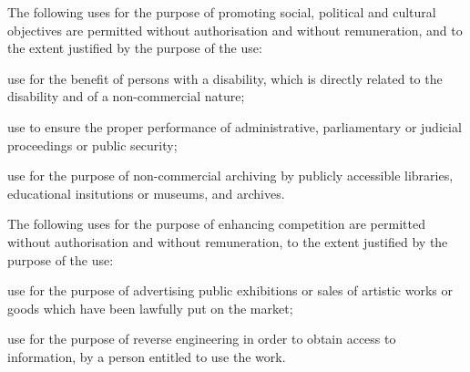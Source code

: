 \begin{contract}
\label{Par:UsesPermittedToPromoteSocialPoliticalAndCulturalObjectives}
\Sentence The following uses for the purpose of promoting social, political and
cultural objectives are permitted without authorisation and without
remuneration, and to the extent justified by the purpose of the use:
\begin{legalenum}
	\item use for the benefit of persons with a disability, which is directly related
				to the disability and of a non-commercial nature;
	\item use to ensure the proper performance of administrative, parliamentary
				or judicial proceedings or public security;
	\item use for the purpose of non-commercial archiving by publicly accessible
libraries, educational insitutions or museums, and archives.
\end{legalenum}


\label{Par:UsesForThePurposeOfEnhancingCompetition}
\Sentence The following uses for the purpose of enhancing competition are \label{Par:UsesForThePurposeOfEnhancingCompetition:Par1}
permitted without authorisation and without remuneration, to the extent
justified by the purpose of the use:
\begin{legalenum}
	\item use for the purpose of advertising public exhibitions or sales of artistic
				works or goods which have been lawfully put on the market;
	\item use for the purpose of reverse engineering in order to obtain access to
				information, by a person entitled to use the work.
\end{legalenum}


\end{contract}
